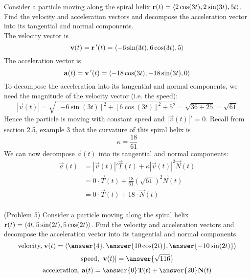 \documentclass[handout]{ximera}
\begin{document}
\begin{example}[Example 5]
Consider a particle moving along the spiral helix $\mathbf r(t) =  \left\langle 2\cos(3t), 2\sin(3t), 5t\right\rangle$.
Find the velocity and acceleration vectors and decompose the acceleration vector into its tangential and normal components.\\
The velocity vector is
\[
\mathbf v(t) = \mathbf r\,'(t) = \left\langle -6\sin(3t), 6\cos(3t), 5\right\rangle
\]
The acceleration vector is
\[
\mathbf a(t) = \mathbf v\,'(t) = \left\langle -18\cos(3t), -18\sin(3t), 0\right\rangle
\]
To decompose the acceleration into its tangential and normal components, we need the magnitude of the velocity vector (i.e. the speed):
\[
|\vec v(t)| = \sqrt{[-6\sin(3t)]^2 + [6\cos(3t)]^2 + 5^2} = \sqrt{36 + 25} = \sqrt{61}
\]
Hence the particle is moving with constant speed and $|\vec v(t)|'$ = 0.
Recall from section 2.5, example 3 that the curvature of this spiral helix is
\[
\kappa = \frac{18}{61}
\]
We can now decompose $\vec a(t)$ into its tangential and normal components:
\begin{align*}
\vec a(t) &= |\vec v(t)|' \vec T(t) + \kappa |\vec v(t)|^2 \vec N(t) \\
          &= 0\cdot \vec T(t) + \frac{18}{61} \left(\sqrt{61}\right)^2 \vec N(t) \\
          &= 0 \cdot \vec T(t) + 18\cdot \vec N(t)\\
\end{align*}

\end{example}

\begin{problem}(Problem 5)
Consider a particle moving along the spiral helix $\mathbf r(t) =  \left\langle 4t, 5 \sin(2t),5\cos(2t)\right\rangle$.
Find the velocity and acceleration vectors and decompose the acceleration vector into its tangential and normal components.\\
\[
\text{velocity,} \; \vec v(t) = \vector{\answer{4},\answer{10\cos(2t)},\answer{-10\sin(2t)}}
\]
\[
\text{speed,} \;  |\vec v(t)| = \answer{\sqrt{116}}
\]
\[
\text{acceleration,} \;  \vec a(t) = \answer{0} \vec T(t) + \answer{20} \vec N(t)
\]

\end{problem}
\end{document}
